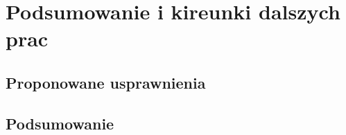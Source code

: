 \chapter{Podsumowanie i kireunki dalszych prac}
\label{summary}
\section{Proponowane usprawnienia}
\section{Podsumowanie}